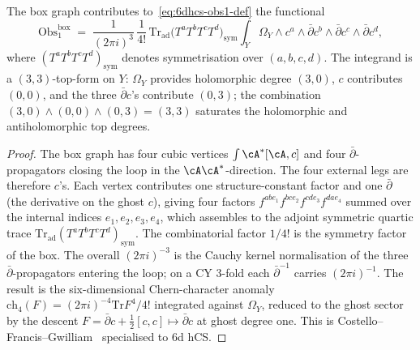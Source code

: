 \begin{proposition}
\label{prop:6dhcs-box-cocycle}
The box graph contributes to~\eqref{eq:6dhcs-obs1-def} the
functional
\begin{equation}\label{eq:6dhcs-box}
 \mathrm{Obs}_1^{\mathrm{box}}
 \;=\;
 \frac{1}{(2\pi i)^3}\,\frac{1}{4!}\,
 \mathrm{Tr}_{\mathrm{ad}}
 \bigl(T^aT^bT^cT^d\bigr)_{\mathrm{sym}}
 \int_Y \Omega_Y\wedge
 c^a\wedge\bar\partial c^b\wedge\bar\partial c^c\wedge\bar\partial c^d,
\end{equation}
where $(T^aT^bT^cT^d)_{\mathrm{sym}}$ denotes symmetrisation over
$(a,b,c,d)$. The integrand is a $(3,3)$-top-form on $Y$: $\Omega_Y$
provides holomorphic degree $(3,0)$, $c$ contributes $(0,0)$, and
the three $\bar\partial c$'s contribute $(0,3)$; the combination
$(3,0)\wedge(0,0)\wedge(0,3)=(3,3)$ saturates the holomorphic and
antiholomorphic top degrees.
\end{proposition}

\begin{proof}
The box graph has four cubic vertices $\int\cA^*[\cA,c]$ and four
$\bar\partial$-propagators closing the loop in the
$\cA\cA^*$-direction. The four external legs are therefore $c$'s.
Each vertex contributes one structure-constant factor and one
$\bar\partial$ (the derivative on the ghost $c$), giving four
factors $f^{abe_1}f^{bce_2}f^{cde_3}f^{dae_4}$ summed over the
internal indices $e_1,e_2,e_3,e_4$, which assembles to the
adjoint symmetric quartic trace
$\mathrm{Tr}_{\mathrm{ad}}(T^aT^bT^cT^d)_{\mathrm{sym}}$. The
combinatorial factor $1/4!$ is the symmetry factor of the box. The
overall $(2\pi i)^{-3}$ is the Cauchy kernel normalisation of the
three $\bar\partial$-propagators entering the loop; on a CY 3-fold
each $\bar\partial^{-1}$ carries $(2\pi i)^{-1}$. The result is the
six-dimensional Chern-character anomaly
$\mathrm{ch}_4(F)=(2\pi i)^{-4}\mathrm{Tr}F^4/4!$ integrated against
$\Omega_Y$, reduced to the ghost sector by the descent
$F=\bar\partial c+\tfrac12[c,c]\mapsto\bar\partial c$ at ghost
degree one. This is Costello--Francis--Gwilliam~\cite{CFG2026}
specialised to 6d hCS.
\end{proof}

